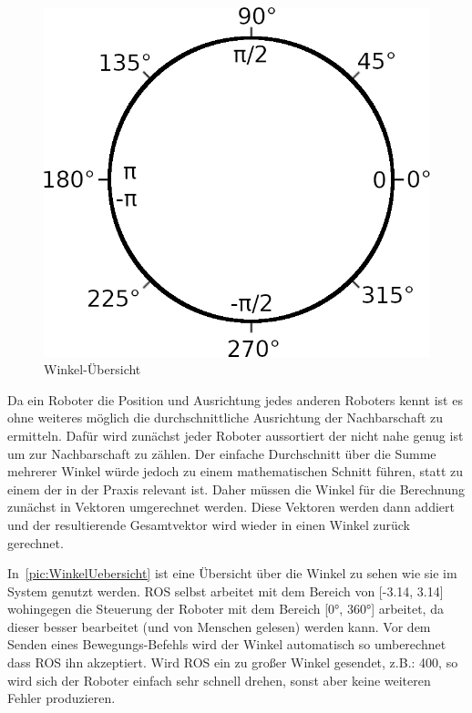 \begin{figure}
	\includegraphics[width=\pictureWidth,keepaspectratio]{graphics/WinkelTemplate.png}
	\caption{Winkel-Übersicht}
	\label{pic:WinkelUebersicht}
\end{figure}

Da ein Roboter die Position und Ausrichtung jedes anderen Roboters kennt ist es ohne weiteres möglich die durchschnittliche Ausrichtung der Nachbarschaft zu ermitteln. Dafür wird zunächst jeder Roboter aussortiert der nicht nahe genug ist um zur Nachbarschaft zu zählen. Der einfache Durchschnitt über die Summe mehrerer Winkel würde jedoch zu einem mathematischen Schnitt führen, statt zu einem der in der Praxis relevant ist. Daher müssen die Winkel für die Berechnung zunächst in Vektoren umgerechnet werden. Diese Vektoren werden dann addiert und der resultierende Gesamtvektor wird wieder in einen Winkel zurück gerechnet.

In~\autoref{pic:WinkelUebersicht} ist eine Übersicht über die Winkel zu sehen wie sie im System genutzt werden. ROS selbst arbeitet mit dem Bereich von [-3.14, 3.14] wohingegen die Steuerung der Roboter mit dem Bereich [0°, 360°] arbeitet, da dieser besser bearbeitet (und von Menschen gelesen) werden kann. Vor dem Senden eines Bewegungs-Befehls wird der Winkel automatisch so umberechnet dass ROS ihn akzeptiert. Wird ROS ein zu großer Winkel gesendet, z.B.: 400, so wird sich der Roboter einfach sehr schnell drehen, sonst aber keine weiteren Fehler produzieren.
 
